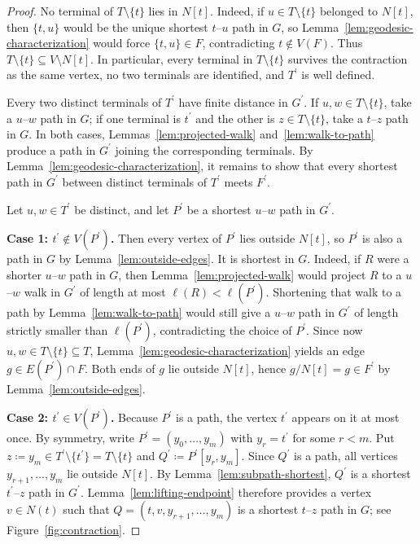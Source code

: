 \documentclass[11pt,a4paper]{amsart}
\theoremstyle{definition}
\theoremstyle{plain}
\newcommand{\len}[1]{\ell(#1)}
\begin{document}
\begin{proof}
No terminal of $T\setminus\{t\}$ lies in $N[t]$. Indeed, if $u\in T\setminus\{t\}$ belonged to $N[t]$, then $\{t,u\}$ would be the unique shortest $t$--$u$ path in $G$, so Lemma~\ref{lem:geodesic-characterization} would force $\{t,u\}\in F$, contradicting $t\notin V(F)$. Thus $T\setminus\{t\}\subseteq V\setminus N[t]$. In particular, every terminal in $T\setminus\{t\}$ survives the contraction as the same vertex, no two terminals are identified, and $T^\prime$ is well defined.

Every two distinct terminals of $T^\prime$ have finite distance in $G^\prime$. If $u,w\in T\setminus\{t\}$, take a $u$--$w$ path in $G$; if one terminal is $t^\prime$ and the other is $z\in T\setminus\{t\}$, take a $t$--$z$ path in $G$. In both cases, Lemmas~\ref{lem:projected-walk} and~\ref{lem:walk-to-path} produce a path in $G^\prime$ joining the corresponding terminals. By Lemma~\ref{lem:geodesic-characterization}, it remains to show that every shortest path in $G^\prime$ between distinct terminals of $T^\prime$ meets $F^\prime$.

Let $u,w\in T^\prime$ be distinct, and let $P^\prime$ be a shortest $u$--$w$ path in $G^\prime$.

\smallskip\noindent
\textbf{Case 1: $t^\prime\notin V(P^\prime)$.}
Then every vertex of $P^\prime$ lies outside $N[t]$, so $P^\prime$ is also a path in $G$ by Lemma~\ref{lem:outside-edges}. It is shortest in $G$. Indeed, if $R$ were a shorter $u$--$w$ path in $G$, then Lemma~\ref{lem:projected-walk} would project $R$ to a $u$--$w$ walk in $G^\prime$ of length at most $\len{R}<\len{P^\prime}$. Shortening that walk to a path by Lemma~\ref{lem:walk-to-path} would still give a $u$--$w$ path in $G^\prime$ of length strictly smaller than $\len{P^\prime}$, contradicting the choice of $P^\prime$. Since now $u,w\in T\setminus\{t\}\subseteq T$, Lemma~\ref{lem:geodesic-characterization} yields an edge $g\in E(P^\prime)\cap F$. Both ends of $g$ lie outside $N[t]$, hence $g/N[t]=g\in F^\prime$ by Lemma~\ref{lem:outside-edges}.

\smallskip\noindent
\textbf{Case 2: $t^\prime\in V(P^\prime)$.}
Because $P^\prime$ is a path, the vertex $t^\prime$ appears on it at most once. By symmetry, write $P^\prime=(y_0,\dots,y_m)$ with $y_r=t^\prime$ for some $r<m$. Put $z\coloneqq y_m\in T^\prime\setminus\{t^\prime\}=T\setminus\{t\}$ and $Q^\prime\coloneqq P^\prime[y_r,y_m]$. Since $Q^\prime$ is a path, all vertices $y_{r+1},\dots,y_m$ lie outside $N[t]$. By Lemma~\ref{lem:subpath-shortest}, $Q^\prime$ is a shortest $t^\prime$--$z$ path in $G^\prime$. Lemma~\ref{lem:lifting-endpoint} therefore provides a vertex $v\in N(t)$ such that $Q=(t,v,y_{r+1},\dots,y_m)$ is a shortest $t$--$z$ path in $G$; see Figure~\ref{fig:contraction}.


\end{proof}
\end{document}
